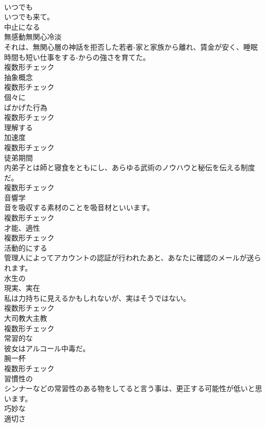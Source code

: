 \documentclass[8pt]{extreport}
\begin{document}
\begin{CJK}{UTF8}{min}
\\	[副詞]	いつでも	
\\	いつでも来て。	
\\	[動詞]	中止になる	
\\	[名詞]	無感動無関心冷淡	
\\	それは、無関心層の神話を拒否した若者-家と家族から離れ、賃金が安く、睡眠時間も短い仕事をする-からの強さを育てた。	
\\	複数形チェック
\\	[名詞]	抽象概念	
\\	複数形チェック
\\	[副詞]	個々に	
\\	[名詞]	ばかげた行為	
\\	複数形チェック
\\	[動詞]	理解する	
\\	[名詞]	加速度	
\\	複数形チェック
\\	[名詞]	徒弟期間	
\\	内弟子とは師と寝食をともにし、あらゆる武術のノウハウと秘伝を伝える制度だ。	
\\	複数形チェック
\\	[名詞]	音響学	
\\	音を吸収する素材のことを吸音材といいます。	
\\	複数形チェック
\\	[名詞]	才能、適性	
\\	複数形チェック
\\	[動詞]	活動的にする	
\\	管理人によってアカウントの認証が行われたあと、あなたに確認のメールが送られます。	
\\	[形容詞]	水生の	
\\	[名詞]	現実、実在	
\\	私は力持ちに見えるかもしれないが、実はそうではない。	
\\	複数形チェック
\\	[名詞]	大司教大主教	
\\	複数形チェック
\\	[形容詞]	常習的な	
\\	彼女はアルコール中毒だ。	
\\	[名詞]	腕一杯	
\\	複数形チェック
\\	[形容詞]	習慣性の	
\\	シンナーなどの常習性のある物をしてると言う事は、更正する可能性が低いと思います。	
\\	[形容詞]	巧妙な	
\\	[名詞]	適切さ	

\end{CJK}
\end{document}
